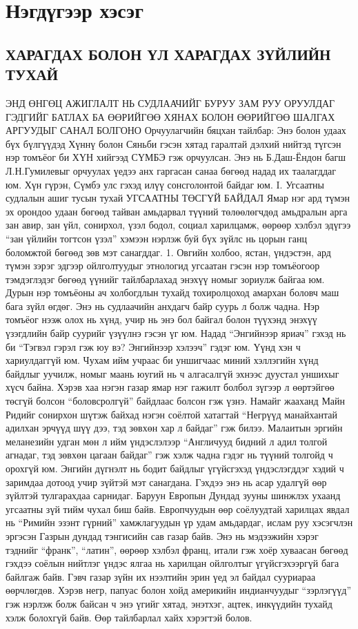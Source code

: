 \chapter{Нэгдүгээр хэсэг}

\section{ХАРАГДАХ БОЛОН ҮЛ ХАРАГДАХ ЗҮЙЛИЙН ТУХАЙ}
ЭНД ӨНГӨЦ АЖИГЛАЛТ НЬ СУДЛААЧИЙГ БУРУУ ЗАМ РУУ ОРУУЛДАГ ГЭДГИЙГ БАТЛАХ БА ӨӨРИЙГӨӨ ХЯНАХ БОЛОН ӨӨРИЙГӨӨ ШАЛГАХ АРГУУДЫГ САНАЛ БОЛГОНО
Орчуулагчийн бяцхан тайлбар: Энэ болон удаах бүх бүлгүүдэд Хүннү болон Сяньби гэсэн хятад гаралтай дэлхий нийтэд түгсэн нэр томъёог би ХҮН хийгээд СҮМБЭ гэж орчуулсан. Энэ нь Б.Даш-Ёндон багш Л.Н.Гумилевыг орчуулах үедээ анх гаргасан санаа бөгөөд надад их таалагддаг юм. Хүн гүрэн, Сүмбэ улс гэхэд илүү сонсголонтой байдаг юм.
I. Угсаатны судлалын ашиг тусын тухай
УГСААТНЫ ТӨСГҮЙ БАЙДАЛ
Ямар нэг ард түмэн эх орондоо удаан бөгөөд тайван амьдарвал түүний төлөөлөгчдөд амьдралын арга зан авир, зан үйл, сонирхол, үзэл бодол, социал харилцамж, өөрөөр хэлбэл эдүгээ “зан үйлийн тогтсон үзэл” хэмээн нэрлэж буй бүх зүйлс нь цорын ганц боломжтой бөгөөд зөв мэт санагддаг.
1. Овгийн холбоо, ястан, үндэстэн, ард түмэн зэрэг эдгээр ойлголтуудыг этнологид угсаатан гэсэн нэр томъёогоор тэмдэглэдэг бөгөөд үүнийг тайлбарлахад энэхүү номыг зориулж байгаа юм. Дурын нэр томъёоны ач холбогдлын тухайд тохиролцоход амархан боловч маш бага зүйл өгдөг. Энэ нь судлаачийн анхдагч байр суурь л болж чадна. Нэр томъёог нээж олох нь хүнд, учир нь энэ бол байгал болон түүхэнд энэхүү үзэгдлийн байр суурийг үзүүлнэ гэсэн үг юм. Надад “Энгийнээр яриач” гэхэд нь би “Тэгвэл гэрэл гэж юу вэ? Энгийнээр хэлээч” гэдэг юм. Үүнд хэн ч хариулдаггүй юм. Чухам ийм учраас би уншигчаас миний хэллэгийн хүнд байдлыг уучилж, номыг маань юугий нь ч алгасалгүй эхнээс дуустал уншихыг хүсч байна.
Хэрэв хаа нэгэн газар ямар нэг гажилт болбол зүгээр л өөртэйгөө төсгүй болсон “боловсролгүй” байдлаас болсон гэж үзнэ. Намайг жааханд Майн Ридийг сонирхон шүтэж байхад нэгэн соёлтой хатагтай “Негрүүд манайхантай адилхан эрчүүд шүү дээ, тэд зөвхөн хар л байдаг” гэж билээ. Малаитын эргийн меланезийн удган мөн л ийм үндэслэлээр “Англичууд бидний л адил толгой агнадаг, тэд зөвхөн цагаан байдаг” гэж хэлж чадна гэдэг нь түүний толгойд ч орохгүй юм. Энгийн дүгнэлт нь бодит байдлыг үгүйсгэхэд үндэслэгддэг хэдий ч заримдаа дотоод учир зүйтэй мэт санагдана. Гэхдээ энэ нь асар удалгүй өөр зүйлтэй тулгарахдаа сарнидаг.
Баруун Европын Дундад зууны шинжлэх ухаанд угсаатны зүй тийм чухал биш байв. Европчуудын өөр соёлуудтай харилцах явдал нь “Римийн эзэнт гүрний” хамжлагуудын үр удам амьдардаг, ислам руу хэсэгчлэн эргэсэн Газрын дундад тэнгисийн сав газар байв. Энэ нь мэдээжийн хэрэг тэднийг “франк”, “латин”, өөрөөр хэлбэл франц, итали гэж хоёр хуваасан бөгөөд гэхдээ соёлын нийтлэг үндэс ялгаа нь харилцан ойлголтыг үгүйсгэхээргүй бага байлгаж байв. Гэвч газар зүйн их нээлтийн эрин үед эл байдал сууриараа өөрчлөгдөв. Хэрэв негр, папуас болон хойд америкийн индианчуудыг “зэрлэгүүд” гэж нэрлэж болж байсан ч энэ үгийг хятад, энэтхэг, ацтек, инкүүдийн тухайд хэлж болохгүй байв. Өөр тайлбарлал хайх хэрэгтэй болов.
